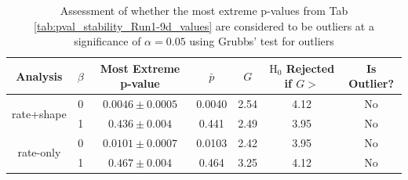 \begin{table}
\centering
\begin{tabular}{|c|c|c|c|c|c|c|}
	\hline
    Analysis                    & $\beta$ & Most Extreme p-value & $\bar{p}$ & $G$  & $\text{H}_0$ Rejected if $G >$ & Is Outlier? \\
	\hline
	\multirow{2}{*}{rate+shape} & 0       & $0.0046 \pm 0.0005$  & 0.0040    & 2.54 & 4.12             & No \\
	\cline{2-7}
	                            & 1       & $0.436 \pm 0.004$    & 0.441     & 2.49 & 3.95             & No \\
	\hline
	\multirow{2}{*}{rate-only}  & 0       & $0.0101 \pm 0.0007$  & 0.0103    & 2.42 & 3.95             & No \\
	\cline{2-7}
	                            & 1       & $0.467 \pm 0.004$    & 0.464     & 3.25 & 4.12             & No \\
	\hline
\end{tabular}
\caption{
	Assessment of whether the most extreme p-values from Tab \ref{tab:pval_stability_Run1-9d_values} are considered to be outliers at a significance of $\alpha = 0.05$ using Grubbs' test for outliers
}
\label{tab:pval_stability_Run1-9d}
\end{table}
